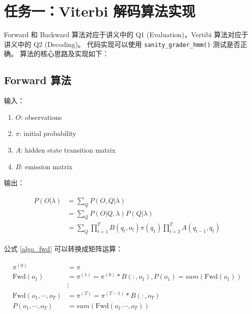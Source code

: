 \documentclass[degree=project,degree-type=project,cjk-font=noto]{thuthesis}
\begin{document}
\maketitle

\frontmatter
% 

\tableofcontents

\listoffigures           %

\mainmatter

\chapter{任务一：Viterbi 解码算法实现}

Forward 和 Backward 算法对应于讲义中的 Q1 (Evaluation)，Vertibi 算法对应于讲义中的 Q2 (Decoding)。
代码实现可以使用 \texttt{sanity\_grader\_hmm()} 测试是否正确。
算法的核心思路及实现如下：

\section{Forward 算法}
  输入：

  \begin{enumerate}
    \item $O$: observations
    \item $\pi$: initial probability
    \item $A$: hidden state transition matrix
    \item $B$: emission matrix
  \end{enumerate}

  输出：

  \begin{align}
    \begin{split}
      P(O | \lambda) &= \sum_{Q} P(O, Q | \lambda) \\
      &= \sum_Q P(O | Q, \lambda) P(Q | \lambda) \\
      &= \sum_Q \prod_{t=1}^T B(q_t, o_t) \pi(q_1) \prod_{t=2}^T A(q_{t-1}, q_t)
    \end{split}
    \label{algo_fwd}
  \end{align}

  公式 \ref{algo_fwd} 可以转换成矩阵运算：

  \begin{align}
    \begin{split}
      \pi^{(0)} &= \pi \\
      \text{Fwd}(o_1) &= \pi^{(1)} = \pi^{(0)} * B(:, o_1), P(o_1) = sum(\text{Fwd}(o_1)) \\
      &\vdots \\
      \text{Fwd}(o_1, \cdots, o_T) &= \pi^{(T)} = \pi^{(T-1)} * B(:, o_T) \\
      P(o_1, \cdots, o_T) &= sum(\text{Fwd}(o_1. \cdots, o_T))
    \end{split}
  \end{align}
\end{document}
